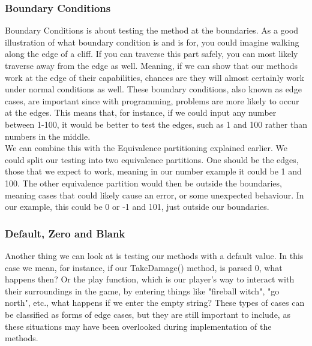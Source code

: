 \subsubsection{Boundary Conditions}
Boundary Conditions is about testing the method at the boundaries. As a good illustration of what boundary condition is and is for, you could imagine walking along the edge of a cliff. If you can traverse this part safely, you can most likely traverse away from the edge as well. Meaning, if we can show that our methods work at the edge of their capabilities, chances are they will almost certainly work under normal conditions as well. These boundary conditions, also known as edge cases, are important since with programming, problems are more likely to occur at the edges\cite{TestingBlackbox}. This means that, for instance, if we could input any number between 1-100, it would be better to test the edges, such as 1 and 100 rather than numbers in the middle. \\
We can combine this with the Equivalence partitioning explained earlier. We could split our testing into two equivalence partitions. One should be the edges, those that we expect to work, meaning in our number example it could be 1 and 100. The other equivalence partition would then be outside the boundaries, meaning cases that could likely cause an error, or some unexpected behaviour. In our example, this could be 0 or -1 and 101, just outside our boundaries. 
\subsubsection{Default, Zero and Blank}
Another thing we can look at is testing our methods with a default value. In this case we mean, for instance, if our TakeDamage() method, is parsed 0, what happens then? Or the play function, which is our player's way to interact with their surroundings in the game, by entering things like "fireball witch", "go north", etc., what happens if we enter the empty string? These types of cases can be classified as forms of edge cases, but  they are still important to include, as these situations may have been overlooked during implementation of the methods\cite{TestingBlackbox}.
